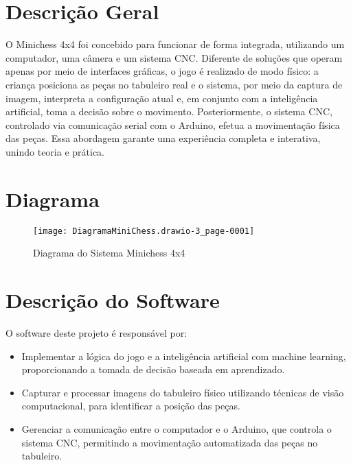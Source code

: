 \documentclass[a4paper,12pt]{article}
\begin{document}
\section{Descrição Geral}
O Minichess 4x4 foi concebido para funcionar de forma integrada, utilizando um computador, uma câmera e um sistema CNC. Diferente de soluções que operam apenas por meio de interfaces gráficas, o jogo é realizado de modo físico: a criança posiciona as peças no tabuleiro real e o sistema, por meio da captura de imagem, interpreta a configuração atual e, em conjunto com a inteligência artificial, toma a decisão sobre o movimento. Posteriormente, o sistema CNC, controlado via comunicação serial com o Arduino, efetua a movimentação física das peças. Essa abordagem garante uma experiência completa e interativa, unindo teoria e prática.

\section{Diagrama}
\begin{figure}[H]
    \centering
    \texttt{[image: DiagramaMiniChess.drawio-3\_page-0001]} %
    \caption{Diagrama do Sistema Minichess 4x4}
    \label{fig:diagrama}
\end{figure}

\clearpage
\vspace{1em}

\section{Descrição do Software}
O software deste projeto é responsável por:
\begin{itemize}
    \item Implementar a lógica do jogo e a inteligência artificial com machine learning, proporcionando a tomada de decisão baseada em aprendizado.
    \item Capturar e processar imagens do tabuleiro físico utilizando técnicas de visão computacional, para identificar a posição das peças.
    \item Gerenciar a comunicação entre o computador e o Arduino, que controla o sistema CNC, permitindo a movimentação automatizada das peças no tabuleiro.
\end{itemize}
\end{document}
